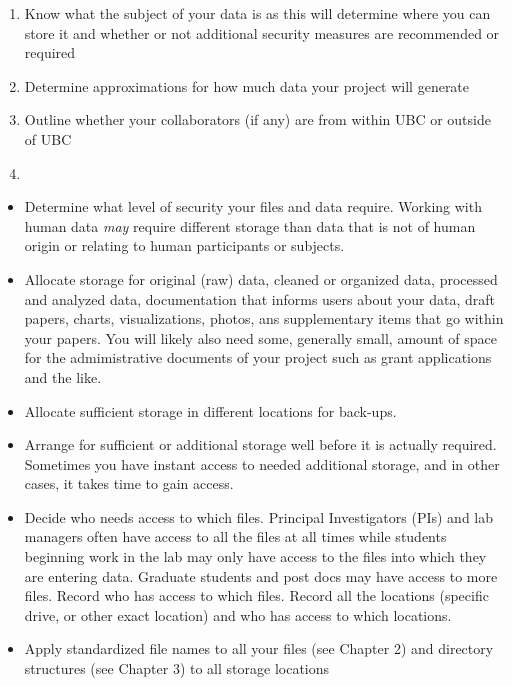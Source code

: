 \documentclass[
]{book}
\providecommand{\tightlist}{%
  \setlength{\itemsep}{0pt}\setlength{\parskip}{0pt}}
\begin{document}
\begin{enumerate}
\def\labelenumi{\arabic{enumi}.}
\tightlist
\item
  Know what the subject of your data is as this will determine where you can store it and whether or not additional security measures are recommended or required
\item
  Determine approximations for how much data your project will generate
\item
  Outline whether your collaborators (if any) are from within UBC or outside of UBC
\item
\end{enumerate}

\begin{itemize}
\tightlist
\item
  Determine what level of security your files and data require. Working with human data \emph{may} require different storage than data that is not of human origin or relating to human participants or subjects.
\item
  Allocate storage for original (raw) data, cleaned or organized data, processed and analyzed data, documentation that informs users about your data, draft papers, charts, visualizations, photos, ans supplementary items that go within your papers. You will likely also need some, generally small, amount of space for the admimistrative documents of your project such as grant applications and the like.
\item
  Allocate sufficient storage in different locations for back-ups.
\item
  Arrange for sufficient or additional storage well before it is actually required. Sometimes you have instant access to needed additional storage, and in other cases, it takes time to gain access.
\item
  Decide who needs access to which files. Principal Investigators (PIs) and lab managers often have access to all the files at all times while students beginning work in the lab may only have access to the files into which they are entering data. Graduate students and post docs may have access to more files. Record who has access to which files. Record all the locations (specific drive, or other exact location) and who has access to which locations.
\item
  Apply standardized file names to all your files (see Chapter 2) and directory structures (see Chapter 3) to all storage locations
\end{itemize}
\end{document}
